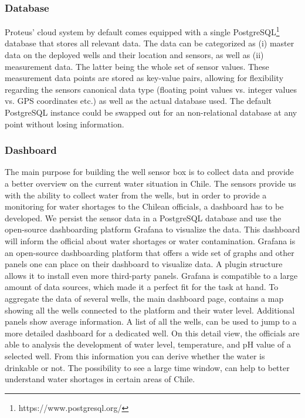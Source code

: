 \documentclass[11pt, letterpaper]{article}
\begin{document}
\subsubsection{Database} \label{sssec:database}
Proteus' cloud system by default comes equipped with a single PostgreSQL\footnote{https://www.postgresql.org/} database that stores all relevant data. The data can be categorized as (i) master data on the deployed wells and their location and sensors, as well as (ii) measurement data. The latter being the whole set of sensor values. These measurement data points are stored as key-value pairs, allowing for flexibility regarding the sensors canonical data type (floating point values vs. integer values vs. GPS coordinates etc.) as well as the actual database used. The default PostgreSQL instance could be swapped out for an non-relational database at any point without losing information.

\subsubsection{Dashboard}
The main purpose for building the well sensor box is to collect data and provide a better overview on the current water situation in Chile. The sensors provide us with the ability to collect water from the wells, but in order to provide a monitoring for water shortages to the Chilean officials, a dashboard has to be developed. 
We persist the sensor data in a PostgreSQL database and use the open-source dashboarding platform Grafana to visualize the data. This dashboard will inform the official about water shortages or water contamination.
Grafana is an open-source dashboarding platform that offers a wide set of graphs and other panels one can place on their dashboard to visualize data. A plugin structure allows it to install even more third-party panels. Grafana is compatible to a large amount of data sources, which made it a perfect fit for the task at hand. 
To aggregate the data of several wells, the main dashboard page, contains a map showing all the wells connected to the platform and their water level. Additional panels show average information. A list of all the wells, can be used to jump to a more detailed dashboard for a dedicated well. On this detail view, the officials are able to analysis the development of water level, temperature, and pH value of a selected well. From this information you can derive whether the water is drinkable or not. The possibility to see a large time window, can help to better understand water shortages in certain areas of Chile.
\newline
\end{document}
